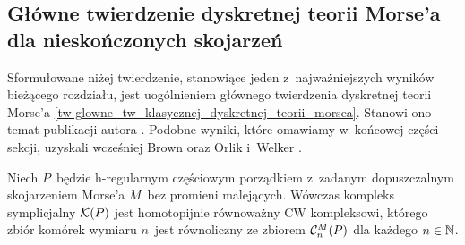 \subsection{Główne twierdzenie dyskretnej teorii Morse'a dla nieskończonych skojarzeń}\label{subsec-glowne_tw_dyskr_teorii_morsea_dla_nsk_skoj}
Sformułowane niżej twierdzenie, stanowiące jeden z~najważniejszych wyników bieżącego rozdziału, jest uogólnieniem głównego twierdzenia dyskretnej teorii Morse'a \ref{tw-glowne_tw_klasycznej_dyskretnej_teorii_morsea}. Stanowi ono temat publikacji autora \cite{Kukiela13}. Podobne wyniki, które omawiamy w~końcowej części sekcji, uzyskali wcześniej Brown \cite[Proposition 1]{Brown92} oraz Orlik i~Welker \cite[Theorem 4.2.14]{Orlik07}.

\begin{tw}\label{maintw}
Niech $P$~będzie h-regularnym częściowym porządkiem z~zadanym dopuszczalnym skojarzeniem Morse'a $M$~bez promieni malejących. Wówczas kompleks symplicjalny $\mathcal{K}(P)$ jest homotopijnie równoważny CW kompleksowi, którego zbiór komórek wymiaru $n$~jest równoliczny ze zbiorem $\mathcal{C}_n^M(P)$ dla każdego $n\in\mathbb{N}$.
\end{tw}
